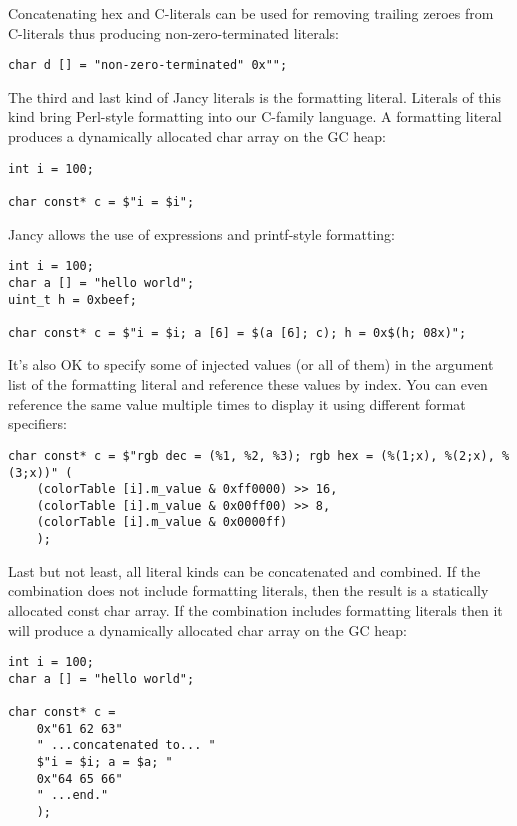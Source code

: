 \documentclass[oneside]{book}
\begin{document}
Concatenating hex and C-literals can be used for removing trailing zeroes from C-literals thus producing non-zero-terminated literals:

\begin{lstlisting}
char d [] = "non-zero-terminated" 0x"";
\end{lstlisting}

The third and last kind of Jancy literals is the formatting literal. Literals of this kind bring Perl-style formatting into our C-family language. A formatting literal produces a dynamically allocated char array on the GC heap:

\begin{lstlisting}
int i = 100;    

char const* c = $"i = $i";
\end{lstlisting}

Jancy allows the use of expressions and printf-style formatting:

\begin{lstlisting}
int i = 100;    
char a [] = "hello world";
uint_t h = 0xbeef;

char const* c = $"i = $i; a [6] = $(a [6]; c); h = 0x$(h; 08x)";
\end{lstlisting}

It's also OK to specify some of injected values (or all of them) in the argument list of the formatting literal and reference these values by index. You can even reference the same value multiple times to display it using different format specifiers:

\begin{lstlisting}
char const* c = $"rgb dec = (%1, %2, %3); rgb hex = (%(1;x), %(2;x), %(3;x))" (
    (colorTable [i].m_value & 0xff0000) >> 16,
    (colorTable [i].m_value & 0x00ff00) >> 8,
    (colorTable [i].m_value & 0x0000ff)
    );
\end{lstlisting}

Last but not least, all literal kinds can be concatenated and combined. If the combination does not include formatting literals, then the result is a statically allocated const char array. If the combination includes formatting literals then it will produce a dynamically allocated char array on the GC heap:

\begin{lstlisting}
int i = 100;    
char a [] = "hello world";

char const* c = 
    0x"61 62 63" 
    " ...concatenated to... " 
    $"i = $i; a = $a; " 
    0x"64 65 66" 
    " ...end."
    );
\end{lstlisting}
\end{document}
